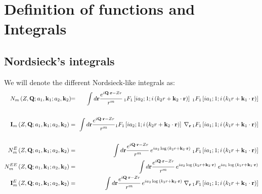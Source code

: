 \chapter{Definition of functions and Integrals}
\label{C:Defin-funct-Integ}
\section[Nordsieck's integrals]
{Nordsieck's integrals \cite{Nordsie1954PRp785}}

We will denote the different Nordsieck-like integrals as:
%
\begin{eqnarray} \label{Q:Nm}
N_{m} \left(Z, \mathbf{Q} ; a_{1}, \mathbf{k}_{1} ; a_{2}, \mathbf{k}_{2} \right)
\!\!&=&\!\! \int d \mathbf{r} \frac{e^{i \mathbf{Q} \cdot \mathbf{r} - Z
r}}{r^{m}} \, {_{1}F_{1}} \left[ i a_{2} ; 1 ;i \left( k_{2} r +
\mathbf{k}_{2}\cdot \mathbf{r} \right)\right] \; {_{1}F_{1}} \left[ i a_{1}
; 1 ;i \left(k_{1} r + \mathbf{k}_{1}\cdot \mathbf{r} \right) \right]
 \nonumber \\ \\
\mathbf{I}_{m} \left(Z, \mathbf{Q}; a_{1}, \mathbf{k}_{1} ; a_{2}, \mathbf{k}_{2}
\right) &=&\!\! \int d \mathbf{r} \frac{e^{i \mathbf{Q} \cdot \mathbf{r} -
Z r}}{r^{m}} {_{1}F_{1}} \left[ i a_{2} ; 1 ;i \left(k_{2} r +
\mathbf{k}_{2}\cdot \mathbf{r} \right)\right] \; \nabla_{\mathbf{r}} \,{_{1}F_{1}}
\left[ i a_{1} ; 1 ;i \left(k_{1} r + \mathbf{k}_{1}\cdot \mathbf{r}
\right)\right]  \nonumber
\\   \label{Q:Im}
\\ \label{Q:NEm}
N^{E}_{m} \left(Z, \mathbf{Q} ; a_{1}, \mathbf{k}_{1} ; a_{2}, \mathbf{k}_{2}
\right) &=& \int d \mathbf{r} \frac{e^{i \mathbf{Q} \cdot \mathbf{r} - Z
r}}{r^{m}} \, e^{i a_{2} \log{ \left( k_{2} r + \mathbf{k}_{2}\cdot
\mathbf{r} \right)}} \; {_{1}F_{1}} \left[ i a_{1} ; 1 ;i \left(k_{1}
r + \mathbf{k}_{1}\cdot \mathbf{r} \right) \right]
\\  \label{Q:NEEm}
N^{EE}_{m} \left(Z, \mathbf{Q} ; a_{1}, \mathbf{k}_{1} ; a_{2}, \mathbf{k}_{2}
\right) &=& \int d \mathbf{r} \frac{e^{i \mathbf{Q} \cdot \mathbf{r} - Z
r}}{r^{m}} \, e^{i a_{2} \log{ \left( k_{2} r + \mathbf{k}_{2}\cdot
\mathbf{r} \right)}} \; e^{ i a_{1} \log{\left(k_{1} r +
\mathbf{k}_{1}\cdot \mathbf{r} \right)}}
\\    \label{Q:IEm}
\mathbf{I}^{E}_{m} \left(Z, \mathbf{Q}; a_{1}, \mathbf{k}_{1} ; a_{2}, \mathbf{k}_{2}
\right) &=& \int d \mathbf{r} \frac{e^{i \mathbf{Q} \cdot \mathbf{r} - Z
r}}{r^{m}}\,e^{i a_{2} \log{ \left( k_{2} r + \mathbf{k}_{2}\cdot
\mathbf{r} \right)}} \; \nabla_{\mathbf{r}}\, {_{1}F_{1}} \left[ i a_{1} ; 1
;i \left(k_{1} r + \mathbf{k}_{1}\cdot \mathbf{r} \right)\right]
\end{eqnarray}

